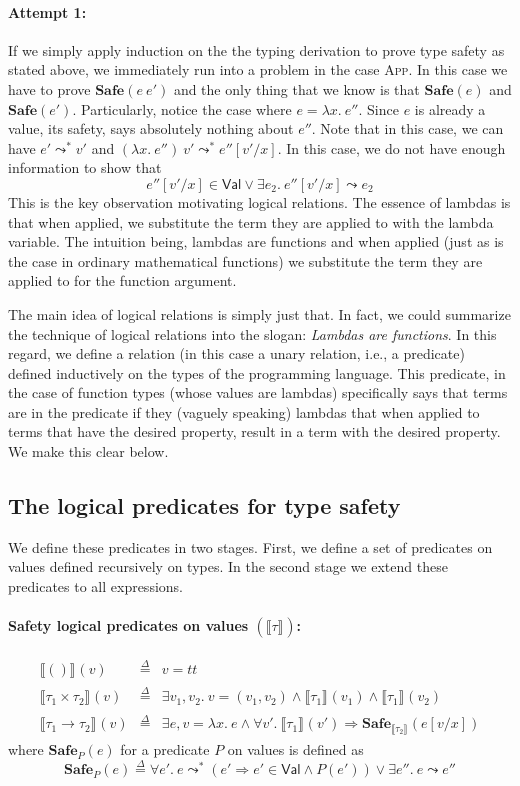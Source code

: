 \documentclass{article}
\newcommand{\TT}{\mathit{tt}}
\newcommand{\VAL}{\mathsf{Val}}
\newcommand{\UNT}{()}
\newcommand{\defeq}{\overset{\Delta}{=}}
\newcommand{\semtyp}[2]{\llbracket #2 \rrbracket_{#1}}
\begin{document}
\paragraph{Attempt 1:}
If we simply apply induction on the the typing derivation to prove
type safety as stated above, we immediately run into a problem
in the case \textsc{App}. In this case we have to prove $\mathbf{Safe}(e~e')$ and the only thing that we know is that $\mathbf{Safe}(e)$ and $\mathbf{Safe}(e')$.
Particularly, notice the case where $e = \lambda x.~e''$.
Since $e$ is already a value, its safety, says absolutely nothing about $e''$.
Note that in this case, we can have $e' \leadsto^* v'$ and
$(\lambda x.~e'')~v' \leadsto^* e''[v'/x]$.
In this case, we do not have enough information to show that
\[
e''[v'/x] \in \VAL \lor \exists e_2.~e''[v'/x] \leadsto e_2
\]
This is the key observation motivating logical relations.
The essence of lambdas is that when applied, we substitute the
term they are applied to with the lambda variable.
The intuition being, lambdas are functions and when applied
(just as is the case in ordinary mathematical functions) we substitute the term they are applied to for the function argument.

The main idea of logical relations is simply just that.
In fact, we could summarize the technique of logical relations into
the slogan: \emph{Lambdas are functions}.
In this regard, we define a relation (in this case a unary relation, i.e., a predicate) defined inductively on the types of the programming language. This predicate, in the case of function types (whose values are lambdas) specifically says that terms
are in the predicate if they (vaguely speaking) lambdas that
when applied to terms that have the desired property, result in
a term with the desired property. We make this clear below.

\subsection{The logical predicates for type safety}
We define these predicates in two stages. First, we define a
set of predicates on values defined recursively on types.
In the second stage we extend these predicates to all expressions.

\paragraph{Safety logical predicates on values $\left(\semtyp{}{\tau}\right)$:}
\[
\begin{array}{lll}
\semtyp{}{\UNT}(v) &\defeq& v = \TT\\
\semtyp{}{\tau_1 \times \tau_2}(v) &\defeq& \exists v_1, v_2.~v = (v_1, v_2) \land
\semtyp{}{\tau_1}(v_1) \land \semtyp{}{\tau_1}(v_2)\\
\semtyp{}{\tau_1 \to \tau_2}(v) &\defeq& \exists e, v = \lambda x.~e\land
\forall v'.~\semtyp{}{\tau_1}(v') \Rightarrow \mathbf{Safe}_{\semtyp{}{\tau_2}}(e[v/x])
\end{array}
\]
where $\mathbf{Safe}_{P}(e)$ for a predicate $P$ on values is defined as
\[
\mathbf{Safe}_{P}(e) \defeq \forall e'.~ e \leadsto^* (e'
\Rightarrow e' \in \VAL \land P(e')) \lor \exists e''.~e\leadsto e''
\]
\end{document}

